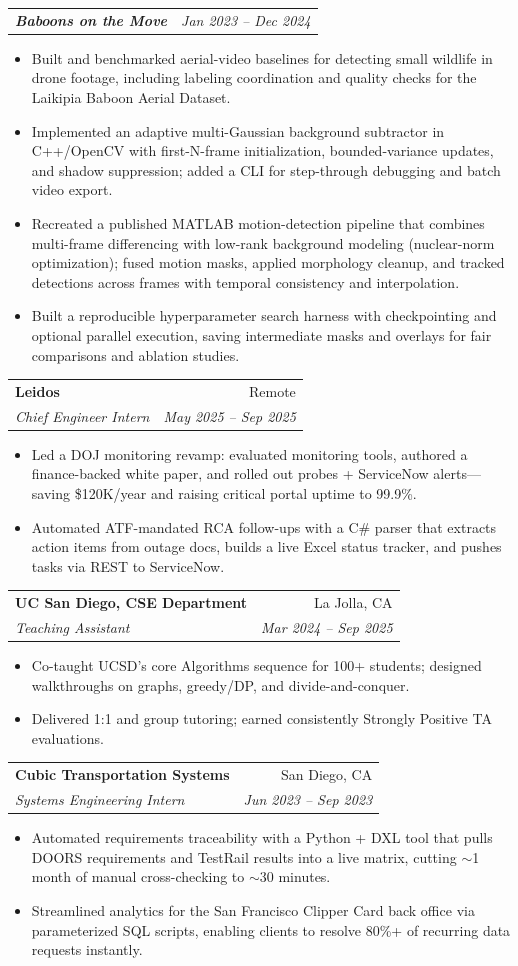 \documentclass[letterpaper,11pt]{article}
\makeatletter
\newcommand{\resumeItem}[1]{
  \item\small{
    {#1 \vspace{-2pt}}
  }
}
\newcommand{\resumeSubheading}[4]{
  \vspace{-1pt}\item
    \begin{tabular*}{0.97\textwidth}[t]{l@{\extracolsep{\fill}}r}
      \textbf{#1} & #2 \\
      \textit{\small#3} & \textit{\small #4} \\
    \end{tabular*}\vspace{-5pt}
}
\newcommand{\resumeSubSubheading}[2]{
    \begin{tabular*}{0.97\textwidth}{l@{\extracolsep{\fill}}r}
      \textit{\small\textbf{#1}} & \textit{\small #2} \\
    \end{tabular*}\vspace{-5pt}
}
\newcommand{\resumeItemListStart}{\begin{itemize}}
\newcommand{\resumeItemListEnd}{\end{itemize}\vspace{-5pt}}
\makeatother
\begin{document}
      \resumeSubSubheading
        {Baboons on the Move}{Jan 2023 -- Dec 2024}
        \resumeItemListStart
          \resumeItem{Built and benchmarked aerial-video baselines for detecting small wildlife in drone footage, including labeling coordination and quality checks for the Laikipia Baboon Aerial Dataset.}
          \resumeItem{Implemented an adaptive multi-Gaussian background subtractor in C++/OpenCV with first-N-frame initialization, bounded-variance updates, and shadow suppression; added a CLI for step-through debugging and batch video export.}
          \resumeItem{Recreated a published MATLAB motion-detection pipeline that combines multi-frame differencing with low-rank background modeling (nuclear-norm optimization); fused motion masks, applied morphology cleanup, and tracked detections across frames with temporal consistency and interpolation.}
          \resumeItem{Built a reproducible hyperparameter search harness with checkpointing and optional parallel execution, saving intermediate masks and overlays for fair comparisons and ablation studies.}
        \resumeItemListEnd

    \resumeSubheading
      {Leidos}{Remote}
      {Chief Engineer Intern}{May 2025 -- Sep 2025}
      \resumeItemListStart
        \resumeItem{Led a DOJ monitoring revamp: evaluated monitoring tools, authored a finance-backed white paper, and rolled out probes + ServiceNow alerts---saving \$120K/year and raising critical portal uptime to 99.9\%.}
        \resumeItem{Automated ATF-mandated RCA follow-ups with a C\# parser that extracts action items from outage docs, builds a live Excel status tracker, and pushes tasks via REST to ServiceNow.}
      \resumeItemListEnd

    \resumeSubheading
      {UC San Diego, CSE Department}{La Jolla, CA}
      {Teaching Assistant}{Mar 2024 -- Sep 2025}
      \resumeItemListStart
        \resumeItem{Co-taught UCSD's core Algorithms sequence for 100+ students; designed walkthroughs on graphs, greedy/DP, and divide-and-conquer.}
        \resumeItem{Delivered 1:1 and group tutoring; earned consistently Strongly Positive TA evaluations.}
      \resumeItemListEnd

    \resumeSubheading
      {Cubic Transportation Systems}{San Diego, CA}
      {Systems Engineering Intern}{Jun 2023 -- Sep 2023}
      \resumeItemListStart
        \resumeItem{Automated requirements traceability with a Python + DXL tool that pulls DOORS requirements and TestRail results into a live matrix, cutting $\sim$1 month of manual cross-checking to $\sim$30 minutes.}
        \resumeItem{Streamlined analytics for the San Francisco Clipper Card back office via parameterized SQL scripts, enabling clients to resolve 80\%+ of recurring data requests instantly.}
      \resumeItemListEnd
\end{document}
